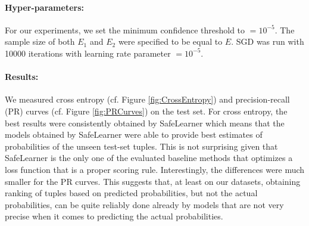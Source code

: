 \documentclass[akbc,twoside,11pt]{article}
\newcommand{\algorithmname}{SafeLearner\xspace}
\begin{document}
\paragraph{Hyper-parameters:}
For our experiments, we set the minimum confidence threshold to $= 10^{-5}$. The sample size of both $E_1$ and $E_2$ were specified to be equal to $E$. SGD was run with 10000 iterations with learning rate parameter $= 10^{-5}$.

\paragraph{Results:} 
We measured cross entropy (cf. Figure \ref{fig:CrossEntropy}) and precision-recall (PR) curves (cf. Figure \ref{fig:PRCurves}) on the test set. For cross entropy, the best results were consistently obtained by \algorithmname which means that the models obtained by \algorithmname were able to provide best estimates of probabilities of the unseen test-set tuples. This is not surprising given that \algorithmname is the only one of the evaluated baseline methods that optimizes a loss function that is a proper scoring rule. Interestingly, the differences were much smaller for the PR curves. This suggests that, at least on our datasets, obtaining ranking of tuples based on predicted probabilities, but not the actual probabilities, can be quite reliably done already by models that are not very precise when it comes to predicting the actual probabilities.
\end{document}
